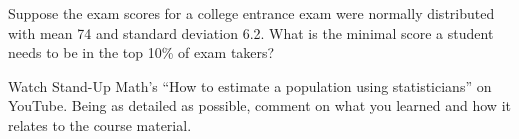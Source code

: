 \documentclass[11pt,letterpaper]{article}
\begin{document}
\newpage



 Suppose the exam scores for a college entrance exam were normally distributed with mean 74 and standard deviation 6.2. What is the minimal score a student needs to be in the top 10\% of exam takers? 



\newpage



 Watch Stand-Up Math's ``How to estimate a population using statisticians'' on YouTube. Being as detailed as possible, comment on what you learned and how it relates to the course material. 
\end{document}
